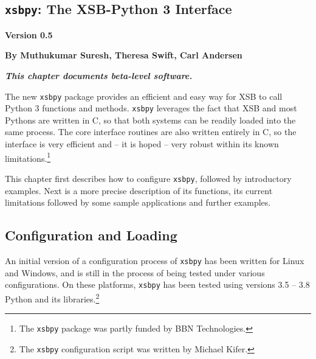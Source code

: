 
\newcommand{\xsbpyversion}{Version 0.5}

\begin{center}
\chapter[XSB and Python]{{\tt xsbpy}: The XSB-Python 3 Interface} \label{chap:xsbpy}
\end{center}

\vspace*{-.30in} 
\begin{center}
{\Large {\bf  \xsbpyversion}}
\end{center}

\begin{center}
  {\Large {\bf By Muthukumar Suresh, Theresa Swift, Carl Andersen}}
\end{center}

\noindent
{\large {\bf {\em This chapter documents beta-level software.}}}

%

The new {\tt xsbpy} package provides an efficient and easy way for XSB
to call Python 3 functions and methods.  {\tt xsbpy} leverages the
fact that XSB and most Pythons are written in C, so that both systems
can be readily loaded into the same process. The core interface
routines are also written entirely in C, so the interface is very
efficient and -- it is hoped -- very robust within its known
limitations.\footnote{The {\tt xsbpy} package was partly funded by BBN
  Technologies.}

This chapter first describes how to configure {\tt xsbpy}, followed by
introductory examples.  Next is a more precise description of its
functions, its current limitations followed by some sample
applications and further examples.

\section{Configuration and Loading}

An initial version of a configuration process of {\tt xsbpy} has been
written for Linux and Windows, and is still in the process of being
tested under various configurations.  On these platforms, {\tt xsbpy}
has been tested using versions 3.5 -- 3.8 Python and its
libraries.\footnote{The {\tt xsbpy} configuration script was written
  by Michael Kifer.}

